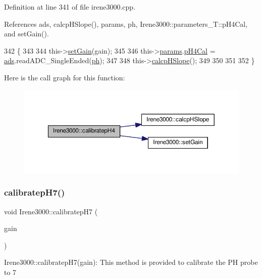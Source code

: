 Definition at line 341 of file irene3000.\+cpp.



References ads, calcp\+H\+Slope(), params, ph, Irene3000\+::parameters\+\_\+\+T\+::p\+H4\+Cal, and set\+Gain().


\begin{DoxyCode}
342 \{
343 
344   this->\hyperlink{classIrene3000_aff7c5da186b388e7272e63ff88a20c34}{setGain}(gain);
345         
346   this->\hyperlink{classIrene3000_a136585a5ee7f9ac6ab52175fa153f8e3}{params}.\hyperlink{structIrene3000_1_1parameters__T_a1144de6fb54eb3e1dd2a3d8c2afc97dc}{pH4Cal} =  \hyperlink{classIrene3000_a1215e77ba761c9908d80d691f149e135}{ads}.readADC\_SingleEnded(\hyperlink{Irene3000_8h_af771ceafe0e6524dd8497d4305dfe778}{ph});
347  
348   this->\hyperlink{classIrene3000_a81f6a79e546679692053f7ac1af49613}{calcpHSlope}();
349 
350 
351 
352 \}
\end{DoxyCode}
Here is the call graph for this function\+:\nopagebreak
\begin{figure}[H]
\begin{center}
\leavevmode
\includegraphics[width=350pt]{classIrene3000_a9772eeea2305fad6236a82e33e93892e_cgraph}
\end{center}
\end{figure}
\mbox{\label{classIrene3000_a2e810ddfa8b95eaa2446a408761c6bdc}} 
\subsubsection{\texorpdfstring{calibratep\+H7()}{calibratepH7()}}
{\footnotesize\ttfamily void Irene3000\+::calibratep\+H7 (\begin{DoxyParamCaption}\item[{ads\+Gain\+\_\+t}]{gain }\end{DoxyParamCaption})}

Irene3000\+::calibratep\+H7(gain)\+: This method is provided to calibrate the PH probe to 7 

